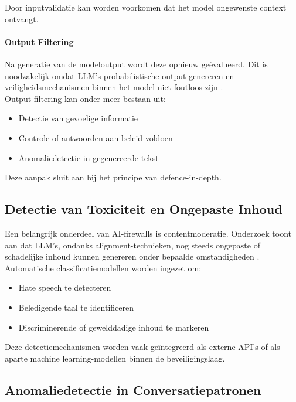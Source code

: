 Door inputvalidatie kan worden voorkomen dat het model ongewenste context ontvangt.

\paragraph{Output Filtering}
Na generatie van de modeloutput wordt deze opnieuw geëvalueerd. Dit is noodzakelijk omdat LLM’s probabilistische output genereren en veiligheidsmechanismen binnen het model niet foutloos zijn \autocite{zou2023jailbreak}.\\

Output filtering kan onder meer bestaan uit:
\begin{itemize}
    \item Detectie van gevoelige informatie
    \item Controle of antwoorden aan beleid voldoen
    \item Anomaliedetectie in gegenereerde tekst
\end{itemize}

Deze aanpak sluit aan bij het principe van defence-in-depth.

\subsection{Detectie van Toxiciteit en Ongepaste Inhoud}

Een belangrijk onderdeel van AI-firewalls is contentmoderatie. Onderzoek toont aan dat LLM’s, ondanks alignment-technieken, nog steeds ongepaste of schadelijke inhoud kunnen genereren onder bepaalde omstandigheden \autocite{gehman2020realtoxicity}.\\

Automatische classificatiemodellen worden ingezet om:
\begin{itemize}
    \item Hate speech te detecteren
    \item Beledigende taal te identificeren
    \item Discriminerende of gewelddadige inhoud te markeren
\end{itemize}

Deze detectiemechanismen worden vaak geïntegreerd als externe API’s of als aparte machine learning-modellen binnen de beveiligingslaag.

\subsection{Anomaliedetectie in Conversatiepatronen}

